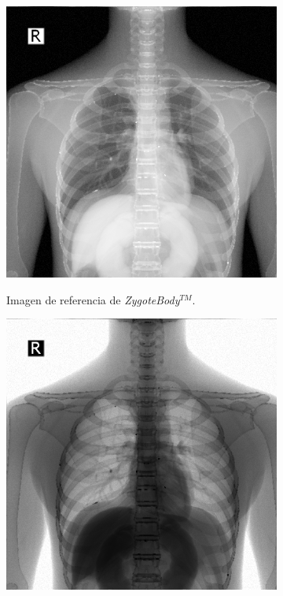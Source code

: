 \begin{figure}[h]
\begin{subfigure}[b]{0.3\linewidth}
        \centering
        {\includegraphics[width=\linewidth]{IMG/XRayMaleNormal2.png}}
        \caption{Imagen de referencia de  \emph{ZygoteBody}$^{TM}$. \label{xraynormal}}
    \end{subfigure}
    \null\hfill
    \begin{subfigure}[b]{0.3\linewidth}
        \centering
        {\includegraphics[width=\linewidth]{IMG/XrayMaleNegative2.png}}

\end{subfigure}
\end{figure}
